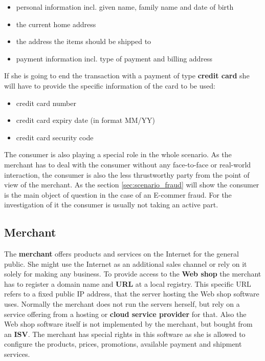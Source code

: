\begin{itemize}
		\item personal information incl. given name, family name and date of birth
		\item the current home address
		\item the address the items should be shipped to
		\item payment information incl. type of payment and billing address
\end{itemize}

If she is going to end the transaction with a payment of type \textbf{credit card} she will have to provide the specific information of the card to be used:\@

\begin{itemize}
		\item credit card number
		\item credit card expiry date (in format MM/YY)
		\item credit card security code
\end{itemize}

The consumer is also playing a special role in the whole scenario. As the merchant has to deal with the consumer without any face-to-face or real-world interaction, the consumer is also the less thrustworthy party from the point of view of the merchant. As the section \ref{sec:scenario_fraud} will show the consumer is the main object of question in the case of an E-commer fraud. For the investigation of it the consumer is usually not taking an active part.


\subsection{Merchant}
\label{subsec:stakeholder_merchant}

The \textbf{merchant} offers products and services on the Internet for the general public. She might use the Internet as an additional sales channel or rely on it solely for making any business. To provide access to the \textbf{Web shop} the merchant has to register a domain name and \textbf{\gls{URL}} at a local registry. This specific \gls{URL} refers to a fixed public \gls{IP} address, that the server hosting the Web shop software uses. Normally the merchant does not run the servers herself, but rely on a service offering from a hosting or \textbf{cloud service provider} for that. Also the Web shop software itself is not implemented by the merchant, but bought from an \textbf{\gls{ISV}}. The merchant has special rights in this software as she is allowed to configure the products, prices, promotions, available payment and shipment services. \\

